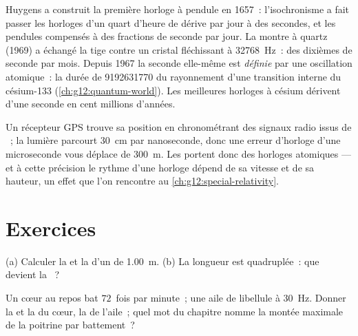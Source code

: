 \begin{example}\label{ex:g12:oscillators-and-time:clocks}
Huygens a construit la première horloge à pendule en \num{1657}~:
l'isochronisme a fait passer les horloges d'un quart d'heure de
dérive par jour à des secondes, et les pendules compensés à des
fractions de seconde par jour. La montre à quartz (\num{1969}) a
échangé la tige contre un cristal fléchissant à \qty{32768}{Hz}~:
des dixièmes de seconde par mois. Depuis \num{1967} la seconde
elle-même est \emph{définie} par une oscillation atomique~: la durée
de \num{9192631770}  du rayonnement  d'une
transition interne du césium-133 (\cref{ch:g12:quantum-world}). Les
meilleures horloges à césium dérivent d'une seconde en cent millions
d'années.
\end{example}

\begin{remark}\label{rem:g12:oscillators-and-time:gps}
Un récepteur GPS trouve sa position en chronométrant des
signaux radio issus de
~; la lumière parcourt \qty{30}{cm} par
nanoseconde, donc une erreur d'horloge d'une microseconde vous
déplace de \qty{300}{m}. Les  portent donc des
horloges atomiques --- et à cette précision le rythme d'une horloge
dépend de sa vitesse et de sa hauteur, un effet que l'on rencontre
au \cref{ch:g12:special-relativity}.
\end{remark}

\section{Exercices}

\begin{exercise}[$\star$]\label{exo:g12:oscillators-and-time:1}
(a) Calculer la  et la 
d'un  de \qty{1.00}{m}. (b) La longueur
est quadruplée~: que devient la ~?
\end{exercise}

\begin{exercise}[$\star$]\label{exo:g12:oscillators-and-time:2}
Un cœur au repos bat $72$~fois par minute~; une aile de libellule à
\qty{30}{Hz}. Donner la  et la
 du cœur, la  de l'aile~;
quel mot du chapitre nomme la montée maximale de la poitrine par
battement~?
\end{exercise}

